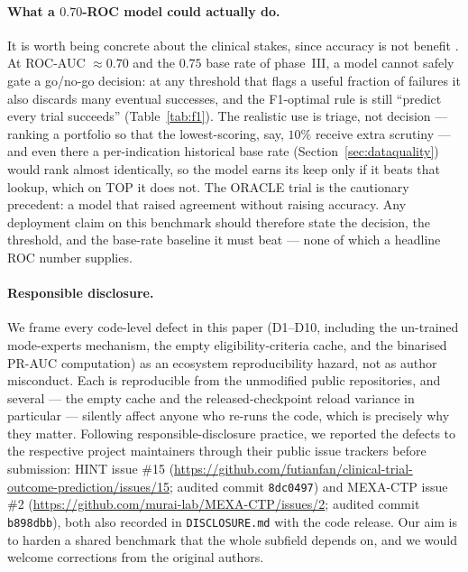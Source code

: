 \documentclass[a4paper,fleqn]{cas-sc}
\begin{document}
\paragraph{What a $0.70$-ROC model could actually do.} It is worth being concrete about the
clinical stakes, since accuracy is not benefit \citep{fritz2024effect}. At ROC-AUC $\approx0.70$
and the $0.75$ base rate of phase~III, a model cannot safely gate a go/no-go decision: at any
threshold that flags a useful fraction of failures it also discards many eventual successes,
and the F1-optimal rule is still ``predict every trial succeeds'' (Table~\ref{tab:f1}). The
realistic use is triage, not decision --- ranking a portfolio so that the lowest-scoring, say,
$10\%$ receive extra scrutiny --- and even there a per-indication historical base rate
(Section~\ref{sec:dataquality}) would rank almost identically, so the model earns its keep only
if it beats that lookup, which on TOP it does not. The ORACLE trial \citep{fritz2024effect} is
the cautionary precedent: a model that raised agreement without raising accuracy. Any
deployment claim on this benchmark should therefore state the decision, the threshold, and the
base-rate baseline it must beat --- none of which a headline ROC number supplies.
\paragraph{Responsible disclosure.} We frame every code-level defect in this paper (D1--D10,
including the un-trained mode-experts mechanism, the empty eligibility-criteria cache, and the
binarised PR-AUC computation) as an ecosystem reproducibility hazard, not as author misconduct.
Each is reproducible from the unmodified public repositories, and several --- the empty cache
and the released-checkpoint reload variance in particular --- silently affect anyone who
re-runs the code, which is precisely why they matter. Following responsible-disclosure
practice, we reported the defects to the respective project maintainers through their public
issue trackers before submission: HINT issue \#15
(\url{https://github.com/futianfan/clinical-trial-outcome-prediction/issues/15}; audited commit
\texttt{8dc0497}) and MEXA-CTP issue \#2 (\url{https://github.com/murai-lab/MEXA-CTP/issues/2};
audited commit \texttt{b898dbb}), both also recorded in \texttt{DISCLOSURE.md} with the code
release. Our aim is to harden a shared
benchmark that the whole subfield depends on, and we would welcome corrections from the original
authors.
\end{document}
